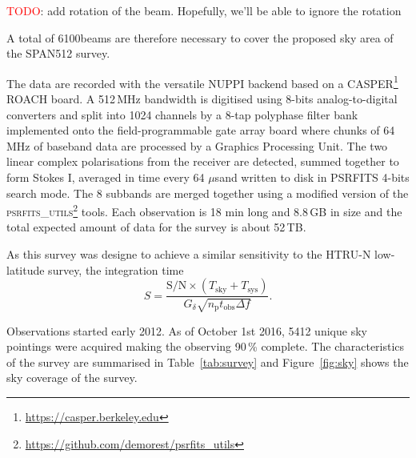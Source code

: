 \documentclass[a4paper,fleqn,usenatbib]{mnras}
\newcommand{\NBeam}{6100}
\newcommand{\us}{$\mu$s}
\newcommand{\TODO}{\textcolor{red}{TODO}}
\begin{document}
\TODO: add rotation of the beam. Hopefully, we'll be able to ignore the rotation

A total of \NBeam beams are therefore necessary to cover the proposed sky area of the
SPAN512 survey.


The data are recorded with the versatile NUPPI backend \citep{dbc+11}
based on a CASPER\footnote{\url{https://casper.berkeley.edu}} ROACH
board. A 512\,MHz bandwidth is digitised using 8-bits
analog-to-digital converters and split into 1024 channels by a 8-tap
polyphase filter bank implemented onto the field-programmable gate
array board where chunks of 64 MHz of baseband data are processed by a
Graphics Processing Unit. The two linear complex polarisations from the receiver are
detected, summed together to form Stokes I, averaged in time every 64
\us and written to disk in \textsc{PSRFITS} 4-bits search mode. The 8
subbands are merged together using a modified version of the
\textsc{psrfits\_utils}\footnote{\url{https://github.com/demorest/psrfits_utils}}
tools. Each observation is 18 min long and 8.8\,GB in size and the total expected amount of data for the
survey is about 52\,TB.

As this survey was designe to achieve a similar sensitivity to the HTRU-N low-latitude survey, the integration time 
\begin{equation}
S = \frac{\text{S/N} \times (T_{\text{sky}} + T_{\text{sys}})}{G_\delta \sqrt{n_\text{p} t_{\text{obs}} \Delta f}}.
\end{equation}

Observations started early 2012. As of October 1st 2016, 5412 unique
sky pointings were acquired making the observing 90\,\% complete. The
characteristics of the survey are summarised in Table~\ref{tab:survey}
and Figure~\ref{fig:sky} shows the sky coverage of the survey.



\end{document}
